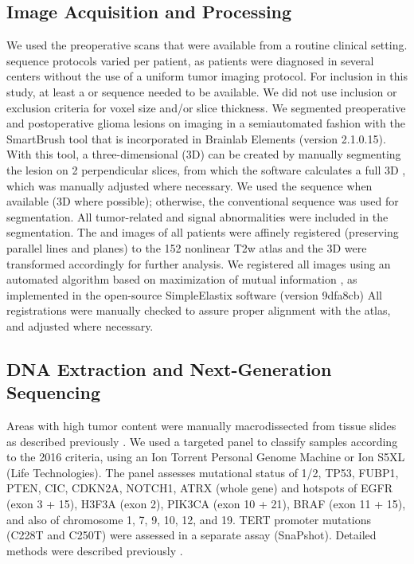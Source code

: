 \subsection{Image Acquisition and Processing}
We used the preoperative  scans that were available from a routine clinical setting.
 sequence protocols varied per patient, as patients were diagnosed in several centers without the use of a uniform \gls{tumor}  imaging protocol.
For inclusion in this study, at least a  or  sequence needed to be available.
We did not use inclusion or exclusion criteria for voxel size and/or slice thickness.
We segmented preoperative and postoperative glioma lesions on  imaging in a semiautomated fashion with the SmartBrush tool that is incorporated in Brainlab Elements (version 2.1.0.15).
With this tool, a three-dimensional (3D)  can be created by manually segmenting the lesion on 2 perpendicular slices, from which the software calculates a full 3D , which was manually adjusted where necessary.
We used the  sequence when available (3D where possible); otherwise, the conventional  sequence was used for segmentation.
All \gls{tumor}-related  and  signal abnormalities were included in the segmentation.
The  and  images of all patients were affinely registered (preserving parallel lines and planes) to the   152 nonlinear T2w atlas \autocite{fonov2011unbiased, fonov2009unbiased} and the 3D  were transformed accordingly for further analysis.
We registered all  images using an automated algorithm based on maximization of mutual information \autocite{klein2009adaptive}, as implemented in the open-source SimpleElastix software (version 9dfa8cb) \autocite{marstal2016simpleelastix}
All registrations were manually checked to assure proper alignment with the atlas, and adjusted where necessary.

\subsection{DNA Extraction and Next-Generation Sequencing}

Areas with high \gls{tumor} content were manually macrodissected from  tissue slides as described previously \autocite{wijnenga2017impact}.
We used a targeted  panel to classify samples according to the  2016 criteria, using an Ion Torrent Personal Genome Machine or Ion S5XL (Life Technologies).
The panel assesses mutational status of 1/2, TP53, FUBP1, PTEN, CIC, CDKN2A, NOTCH1, ATRX (whole gene) and hotspots of EGFR (exon 3 + 15), H3F3A (exon 2), PIK3CA (exon 10 + 21), BRAF (exon 11 + 15), and also  of chromosome 1, 7, 9, 10, 12, and 19.
TERT promoter mutations (C228T and C250T) were assessed in a separate assay (SnaPshot).
Detailed methods were described previously \autocite{wijnenga2017impact, wijnenga2018prognostic}.

